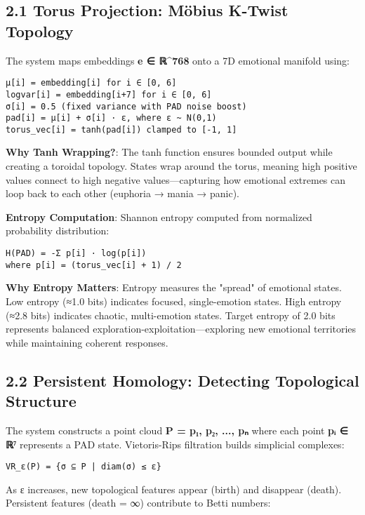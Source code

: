 \documentclass[11pt,a4paper]{article}
\begin{document}
\subsection{2.1 Torus Projection: Möbius K-Twist Topology}

The system maps embeddings \textbf{e ∈ ℝ^768} onto a 7D emotional manifold using:

\begin{verbatim}μ[i] = embedding[i] for i ∈ [0, 6]
logvar[i] = embedding[i+7] for i ∈ [0, 6]
σ[i] = 0.5 (fixed variance with PAD noise boost)
pad[i] = μ[i] + σ[i] · ε, where ε ~ N(0,1)
torus_vec[i] = tanh(pad[i]) clamped to [-1, 1]
\end{verbatim}

\textbf{Why Tanh Wrapping?}: The tanh function ensures bounded output while creating a toroidal topology. States wrap around the torus, meaning high positive values connect to high negative values—capturing how emotional extremes can loop back to each other (euphoria → mania → panic).

\textbf{Entropy Computation}: Shannon entropy computed from normalized probability distribution:
\begin{verbatim}H(PAD) = -Σ p[i] · log(p[i])
where p[i] = (torus_vec[i] + 1) / 2
\end{verbatim}

\textbf{Why Entropy Matters}: Entropy measures the "spread" of emotional states. Low entropy (≈1.0 bits) indicates focused, single-emotion states. High entropy (≈2.8 bits) indicates chaotic, multi-emotion states. Target entropy of 2.0 bits represents balanced exploration-exploitation—exploring new emotional territories while maintaining coherent responses.

\subsection{2.2 Persistent Homology: Detecting Topological Structure}

The system constructs a point cloud \textbf{P = {p₁, p₂, ..., pₙ}} where each point \textbf{pᵢ ∈ ℝ⁷} represents a PAD state. Vietoris-Rips filtration builds simplicial complexes:

\begin{verbatim}VR_ε(P) = {σ ⊆ P | diam(σ) ≤ ε}
\end{verbatim}

As ε increases, new topological features appear (birth) and disappear (death). Persistent features (death = ∞) contribute to Betti numbers:
\end{document}
